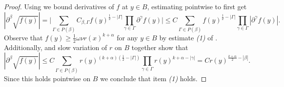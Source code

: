 \documentclass[oneside,hidelinks,indentfirst,10pt]{book}
\begin{document}
\begin{proof}
Using  we bound derivatives of \(f\) at \(y\in B\), estimating pointwise to first get
\[
    |\partial^\beta\sqrt{f(y)}|=\bigg|\sum_{\Gamma\in P(\beta)}C_{\beta,\Gamma}f(y)^{\frac{1}{2}-|\Gamma|}\prod_{\gamma\in\Gamma}\partial^\gamma f(y)\bigg|\leq C\sum_{\Gamma\in P(\beta)}f(y)^{\frac{1}{2}-|\Gamma|}\prod_{\gamma\in\Gamma}|\partial^\gamma f(y)|.
\]
Observe that \(f(y)\geq \frac{1}{2}\omega\nu r(x)^{k+\alpha}\) for any \(y\in B\) by estimate \textit{(1)} of . Additionally,  and slow variation of \(r\) on \(B\) together show that
\[
    |\partial^\beta\sqrt{f(y)}|\leq C\sum_{\Gamma\in P(\beta)}r(y)^{(k+\alpha)(\frac{1}{2}-|\Gamma|)}\prod_{\gamma\in\Gamma}r(y)^{k+\alpha-|\gamma|}= Cr(y)^{\frac{k+\alpha}{2}-|\beta|}.
\]
Since this holds pointwise on \(B\) we conclude that item \textit{(1)} holds.



\end{proof}
\end{document}
